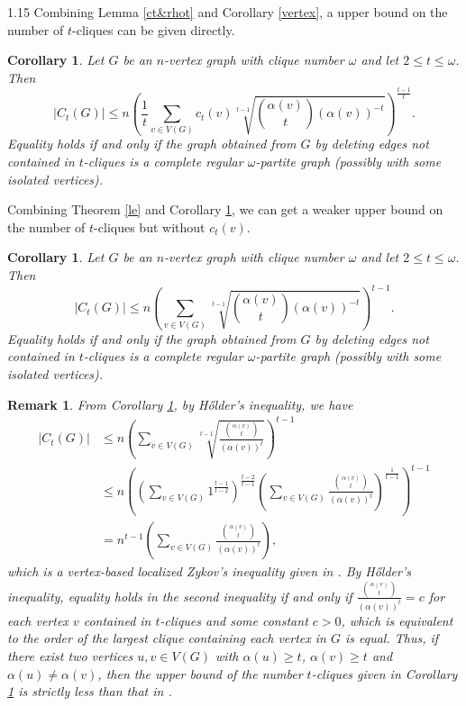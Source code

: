 \documentclass[preprint,12pt]{elsarticle1}
\newtheorem{cor}[thm]{Corollary}
\newtheorem{remark}[thm]{Remark}
\numberwithin{equation}{section}
\begin{document}
\begin{spacing}{1.15}
Combining Lemma \ref{ct&rhot} and  Corollary \ref{vertex}, a upper bound on the number of $t$-cliques can be given directly.

\begin{cor}\label{clique vertex}
Let $G$ be an $n$-vertex graph with clique number $\omega$ and
let $2\leq t\leq \omega$. Then
$$|C_t(G)|\leq n\left( \frac{1}{t}\sum_{v\in V(G)}c_{t}(v) \sqrt[t-1]{{\binom{\alpha(v)}{t}}{\left(\alpha(v)\right)^{-t}}} \right)^{\frac{t-1}{t}}.$$
Equality holds if and only if the graph obtained from $G$ by deleting edges not contained in $t$-cliques is a complete regular $\omega$-partite graph (possibly with some isolated vertices).
\end{cor}
Combining Theorem \ref{le} and  Corollary \ref{clique vertex}, we can get a weaker upper bound on the number of $t$-cliques but without $c_{t}(v)$.

\begin{cor}\label{124}
Let $G$ be an $n$-vertex graph with clique number $\omega$ and let $2\le t\le\omega$. Then
$$|C_t(G)|\leq n\left( \sum_{v\in V(G)} \sqrt[t-1]{\binom{\alpha(v)}{t}\left(\alpha(v)\right)^{-t}} \right)^{t-1}.$$
Equality holds if and only if the graph obtained from $G$ by deleting edges not contained in $t$-cliques is a complete regular $\omega$-partite graph (possibly with some isolated vertices).
\end{cor}

\begin{remark}
From Corollary \ref{124}, by H\H{o}lder's inequality, we have
\begin{align*}
|C_t(G)|&\leq n\left( \sum_{v\in V(G)} \sqrt[t-1]{\frac{\binom{\alpha(v)}{t}}{\left(\alpha(v)\right)^t}} \right)^{t-1}\\
&\leq n\left(\left(\sum_{v\in V(G)}1^{\frac{t-1}{t-2}} \right)^{\frac{t-2}{t-1}}\left(\sum_{v\in V(G)} {\frac{\binom{\alpha(v)}{t}}{\left(\alpha(v)\right)^t}}\right)^{\frac{1}{t-1}}\right)^{t-1}\\
&=n^{t-1}\left(\sum_{v\in V(G)} {\frac{\binom{\alpha(v)}{t}}{\left(\alpha(v)\right)^t}}\right),
\end{align*}
which is a vertex-based localized Zykov's inequality given in \cite{dian4}.
By H\H{o}lder's inequality, equality holds in the second inequality if and only if $\frac{\binom{\alpha(v)}{t}}{\left(\alpha(v)\right)^t}=c$ for each vertex $v$ contained in $t$-cliques and some constant $c>0$, which is equivalent to the order of the largest clique containing each vertex in $G$ is equal.
Thus, if there exist two vertices $u,v\in V(G)$ with $\alpha(u)\ge t$, $\alpha(v)\ge t$ and $\alpha(u)\ne \alpha(v)$, then the upper bound of the number $t$-cliques given in Corollary \ref{124} is strictly less than that in \cite{dian4}.
\end{remark}





\end{spacing}
\end{document}
